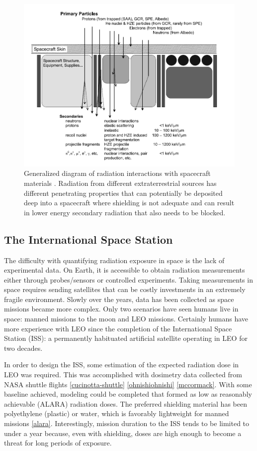 \begin{figure}
\centering
\includegraphics[scale=0.5]{shield_transport.png}
\caption{Generalized diagram of radiation interactions with spacecraft materials \cite{bentonbenton}. Radiation from different extraterrestrial sources has different penetrating properties that can potentially be deposited deep into a spacecraft where shielding is not adequate and can result in lower energy secondary radiation that also needs to be blocked.}
\label{fig:shield-transport }
\end{figure}

\subsection{The International Space Station}

The difficulty with quantifying radiation exposure in space is the lack of experimental data. On Earth, it is accessible to obtain radiation measurements either through probes/sensors or controlled experiments. Taking measurements in space requires sending satellites that can be costly investments in an extremely fragile environment. Slowly over the years, data has been collected as space missions became more complex. Only two scenarios have seen humans live in space: manned missions to the moon and LEO missions. Certainly humans have more experience with LEO since the completion of the International Space Station (ISS): a permanently habituated artificial satellite operating in LEO for two decades.

In order to design the ISS, some estimation of the expected radiation dose in LEO was required. This was accomplished with dosimetry data collected from NASA shuttle flights \ref{cucinotta-shuttle} \ref{ohnishiohnishi} \ref{mccormack}. With some baseline achieved, modeling could be completed that formed as low as reasonably achievable (ALARA) radiation doses. The preferred shielding material has been polyethylene (plastic) or water, which is favorably lightweight for manned missions \ref{alara}. Interestingly, mission duration to the ISS tends to be limited to under a year because, even with shielding, doses are high enough to become a threat for long periods of exposure.

